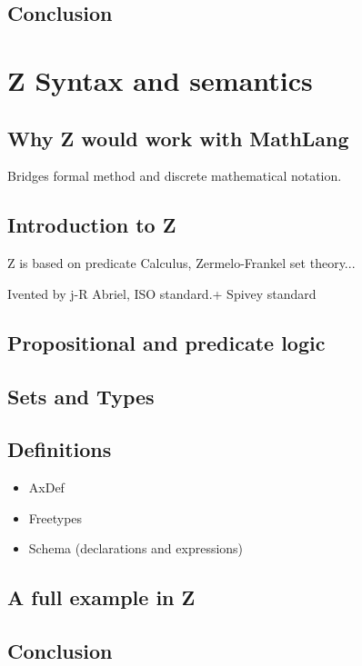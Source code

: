 \subsection{Conclusion}

\section{Z Syntax and semantics}
\label{sec:theznotation}

\subsection{Why Z would work with MathLang}

Bridges formal method and discrete mathematical notation.

\subsection{Introduction to Z}

Z is based on predicate Calculus, Zermelo-Frankel set theory...

Ivented by j-R Abriel, ISO standard.+ Spivey standard

\subsection{Propositional and predicate logic}

\subsection{Sets and Types}

\subsection{Definitions}

\begin{itemize}
\item AxDef
\item Freetypes
\item Schema (declarations and expressions)
\end{itemize}

\subsection{A full example in Z}


\subsection{Conclusion}

